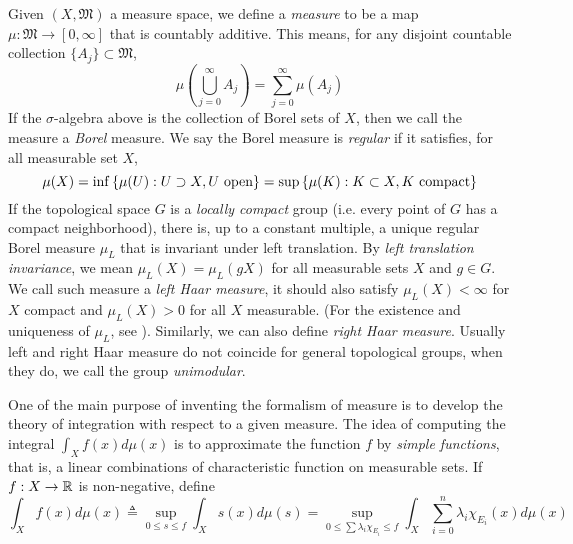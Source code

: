 Given $(X,\mathfrak{M})$ a measure space, we define a \emph{measure} to be a map
$\mu : \mathfrak{M} \to [0,\infty]$ that is countably additive. This means, for
any disjoint countable collection $\{A_j\} \subset \mathfrak{M}$,
\[
  \mu\left( \bigcup_{j = 0}^{\infty} A_j \right) = \sum_{j = 0}^{\infty} \mu(A_j)
\]
If the $\sigma$-algebra above is the collection of Borel sets of $X$, then we
call the measure a \emph{Borel} measure.  We say the Borel measure is
\emph{regular} if it satisfies, for all measurable set $X$,
\[
  \mu(X) = \inf \left\{ \mu(U) : U \supset X, U \text{ open} \right\} = \sup
  \left\{ \mu(K) : K \subset X, K \text{ compact} \right\}
\]
If the topological space $G$ is a \emph{locally compact} group (i.e. every point
of $G$ has a compact neighborhood), there is, up to a constant multiple, a
unique regular Borel measure $\mu_L$ that is invariant under left translation.
By \emph{left translation invariance}, we mean $\mu_L(X) = \mu_L(gX)$ for all
measurable sets $X$ and $g \in G$.  We call such measure a \emph{left Haar
  measure}, it should also satisfy $\mu_L(X) < \infty$ for $X$ compact and
$\mu_L(X) > 0$ for all $X$ measurable. (For the existence and uniqueness of
$\mu_L$, see \cite{halmos2013measure}).  Similarly, we can also define
\emph{right Haar measure}.  Usually left and right Haar measure do not coincide
for general topological groups, when they do, we call the group
\emph{unimodular}.

One of the main purpose of inventing the formalism of measure is to develop the
theory of integration with respect to a given measure.  The idea of computing
the integral $\int_X f(x) d\mu(x)$ is to approximate the function $f$ by
\emph{simple functions}, that is, a linear combinations of characteristic
function on measurable sets.  If $f : X \to \operatorname{\mathbb{R}}$ is non-negative, define
\[
  \int_X f(x) d\mu(x) \triangleq \sup_{0 \leq s \leq f} \int_X s(x) d\mu(s)
  = \sup_{0 \leq \sum \lambda_i \chi_{E_i} \leq f} \int_X \sum_{i = 0}^{n} \lambda_i \chi_{E_i}(x) d\mu(x)
\]

